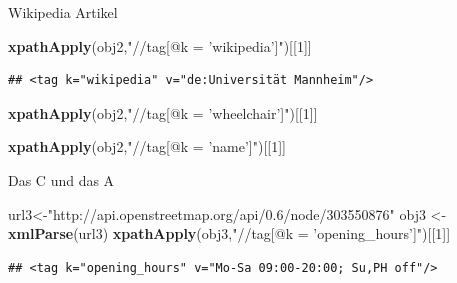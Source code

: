 \documentclass[ignorenonframetext,]{beamer}
\newenvironment{Shaded}{\begin{snugshade}}{\end{snugshade}}
\newcommand{\DecValTok}[1]{\textcolor[rgb]{0.00,0.00,0.81}{#1}}
\newcommand{\KeywordTok}[1]{\textcolor[rgb]{0.13,0.29,0.53}{\textbf{#1}}}
\newcommand{\NormalTok}[1]{#1}
\newcommand{\StringTok}[1]{\textcolor[rgb]{0.31,0.60,0.02}{#1}}
\begin{document}
\begin{frame}[fragile]{Wikipedia Artikel}
\protect\hypertarget{wikipedia-artikel}{}

\begin{Shaded}
\begin{Highlighting}[]
\KeywordTok{xpathApply}\NormalTok{(obj2,}\StringTok{"//tag[@k = 'wikipedia']"}\NormalTok{)[[}\DecValTok{1}\NormalTok{]]}
\end{Highlighting}
\end{Shaded}

\begin{verbatim}
## <tag k="wikipedia" v="de:Universität Mannheim"/>
\end{verbatim}

\begin{Shaded}
\begin{Highlighting}[]
\KeywordTok{xpathApply}\NormalTok{(obj2,}\StringTok{"//tag[@k = 'wheelchair']"}\NormalTok{)[[}\DecValTok{1}\NormalTok{]]}
\end{Highlighting}
\end{Shaded}

\begin{Shaded}
\begin{Highlighting}[]
\KeywordTok{xpathApply}\NormalTok{(obj2,}\StringTok{"//tag[@k = 'name']"}\NormalTok{)[[}\DecValTok{1}\NormalTok{]]}
\end{Highlighting}
\end{Shaded}

\end{frame}

\begin{frame}[fragile]{Das C und das A}
\protect\hypertarget{das-c-und-das-a}{}

\begin{Shaded}
\begin{Highlighting}[]
\NormalTok{url3<-}\StringTok{"http://api.openstreetmap.org/api/0.6/node/303550876"}
\NormalTok{obj3 <-}\StringTok{ }\KeywordTok{xmlParse}\NormalTok{(url3)}
\KeywordTok{xpathApply}\NormalTok{(obj3,}\StringTok{"//tag[@k = 'opening_hours']"}\NormalTok{)[[}\DecValTok{1}\NormalTok{]]}
\end{Highlighting}
\end{Shaded}

\begin{verbatim}
## <tag k="opening_hours" v="Mo-Sa 09:00-20:00; Su,PH off"/>
\end{verbatim}

\end{frame}
\end{document}
